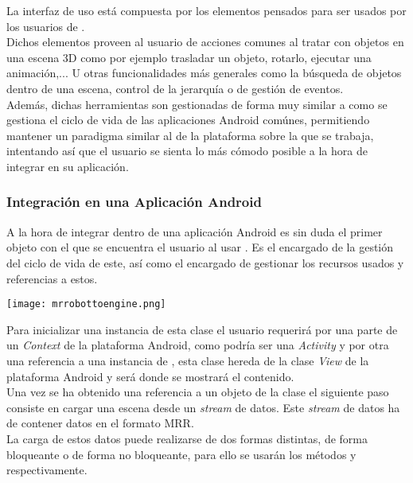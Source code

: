 La interfaz de uso está compuesta por los elementos pensados para ser usados por los usuarios de \robotto.\\
Dichos elementos proveen al usuario de acciones comunes al tratar con objetos en una escena 3D como por ejemplo trasladar un objeto, rotarlo, ejecutar una animación,... U otras funcionalidades más generales como la búsqueda de objetos dentro de una escena, control de la jerarquía o de gestión de eventos.\\
Además, dichas herramientas son gestionadas de forma muy similar a como se gestiona el ciclo de vida de las aplicaciones Android comúnes, permitiendo mantener un paradigma similar al de la plataforma sobre la que se trabaja, intentando así que el usuario se sienta lo más cómodo posible a la hora de integrar \robotto en su aplicación.\\

\subsubsection{Integración en una Aplicación Android}

A la hora de integrar \robotto dentro de una aplicación Android \rorefrobottoengine\label{ro:robottoengine} es sin duda el primer objeto con el que se encuentra el usuario al usar \robotto. Es el encargado de la gestión del ciclo de vida de este, así como el encargado de gestionar los recursos usados y referencias a estos.\\
\begin{center}
\texttt{[image: mrrobottoengine.png]}
\end{center}

Para inicializar una instancia de esta clase el usuario requerirá por una parte de un \textit{Context} de la plataforma Android, como podría ser una \textit{Activity} y por otra una referencia a una instancia de \rorefsurfaceview\label{ro:surfaceview}, esta clase hereda de la clase \textit{View} de la plataforma Android y será donde se mostrará el contenido.\\

Una vez se ha obtenido una referencia a un objeto de la clase \rorefrobottoengine el siguiente paso consiste en cargar una escena desde un \textit{stream} de datos. Este \textit{stream} de datos ha de contener datos en el formato MRR.\\
La carga de estos datos puede realizarse de dos formas distintas, de forma bloqueante o de forma no bloqueante, para ello se usarán los métodos  y  respectivamente.\\


